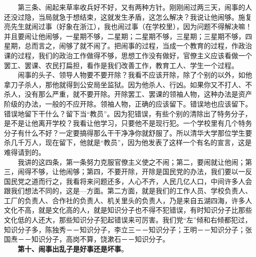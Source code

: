 \documentclass[cn,11pt,chinese]{elegantbook}
\begin{document}
　　第三条、闹起来草率收兵好不好，又有两种方针。刚刚闹过两三天，闹事的人还没过隐，当局就急于想结束，这就发生矛盾，这怎么解决？我说让他闹够。施复亮先生就闹过事（好象在浙江），我也闹过事（在学校里），因为问题不得解决嘛！并且要闹让他闹够，一星期不够，二星期；二星期不够，三星期；三星期不够，四星期，总而言之，闹够了就不闹了。把闹事的过程，当成一个教育的过程，作政治课的过程，我们的政治工作做得不够，思想工作没有做好，官僚主义应该看做一个罢工、罢课、农民打扁担，看作是我们改善工作，教育工人、学生一个过程。\\
　　闹事的头子、领导人物要不要开除？我看不应该开除，除了个别的以外，如他拿刀子杀人，那他就得到公安局坐监狱。因为他杀人、行凶。如果你又不打人、不杀人，没有那么严重，就不要开除。开除罢工、罢课的领袖人物，这种办法是资产阶级的办法，一般的不应开除。领袖人物，正确的应该留下。错误地也应该留下。错误地留下干什么？留下当“教员”。因为犯错误，有些个别的清除出了特务分子，是不是让他离开学校？我看让他学习，只要他不是现行犯。一个学校里有几个特务分子有什么不好？一定要搞得那么干干净净你就舒服了。所以清华大学那位学生要杀几千万人，现在留下，他就是“教员”，因为他发表了这样一个有名的宣言，这是难得请到的。\\
　　我讲的这四条，第一条努力克服官僚主义使之不闹；第二，要闹就让他闹；第三，闹得不够，让他闹够；第四，不要开除，开除是国民党的办法，我们要以一反国民党之道而行之，我看将来问题还多，人心不齐，人民几亿人口，中间许多人会跟我们想法不同的，这是—方面。第二方面，就是我们的工作人员、学校负责人、工厂的负责人、合作社的负责人、机关里头的负责人，乃是来自五湖四海，许多人文化不高，就是文化高的人，就是知识分子也不得不犯错误，有时知识分子比那些文化低的人还大，那些知识分子犯起错误来可厉害。我们党“左”倾和右倾都犯过，知识分子多，陈独秀－－知识分子，李立三－－知识分子；王明－－知识分子；张国焘－－知识分子，高岗不算，饶漱石－－知识分子。\\
　　\textbf{第十、闹事出乱子是好事还是坏事}。\\
\end{document}
